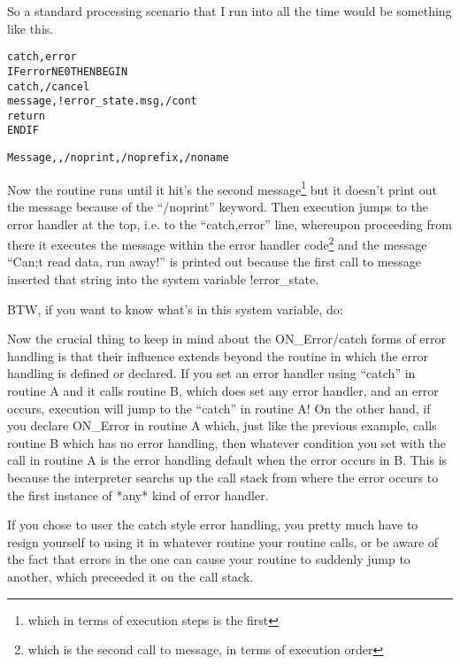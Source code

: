 \begin{itemize}
  So a standard processing scenario that I run into all the time would
 be something like this.


\begin{alltt}
catch, error                      
IF error NE 0 THEN BEGIN          
  catch,/cancel                   
  message,!error_state.msg,/cont
  return
ENDIF   





Message,,/noprint,/noprefix,/noname

                          
\end{alltt}


  Now the routine runs until it hit's the second
 message\footnote{which in terms of execution steps is the first} but
 it doesn't print out the message because of the ``/noprint''
 keyword. Then execution jumps to the error handler at the top,
  i.e. to the ``catch,error'' line, whereupon proceeding from there it
  executes the message within the error handler code\footnote{which is
  the second call to message, in terms of execution order} and the
  message ``Can;t read data, run away!'' is printed out because the
 first call to message inserted that string into the system variable !error\_state.

  BTW, if you want to know what's in this system variable, do:


  Now the crucial thing to keep in mind about the ON\_Error/catch
 forms of error handling is that their influence extends beyond the
 routine in which the error handling is defined or declared. If you
 set an error handler using ``catch'' in routine A and it calls
 routine B, which does  set any error handler, and an error
 occurs, execution will jump to the ``catch'' in routine A! On the
 other hand, if you declare ON\_Error in routine A which, just like
 the previous example, calls routine B which has no error handling,
 then whatever condition you set with the call in routine A is the
 error handling default when the error occurs in B. This is because
 the interpreter searchs up the call stack from where the error occurs
  to the first instance of *any* kind of error handler.

  If you chose to user the catch style error handling, you pretty much
  have to resign yourself to using it in whatever routine your routine
  calls, or be aware of the fact that errors in the one can cause your
  routine to suddenly jump to another, which preceeded it on the call
  stack.

   \end{itemize}
